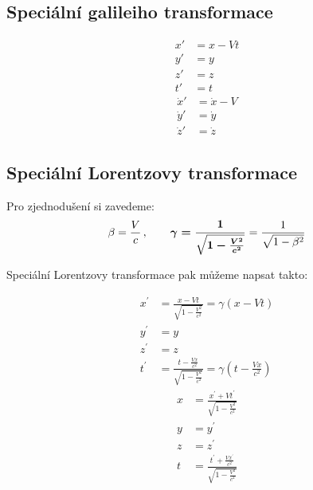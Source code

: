 \documentclass[a5paper,12pt]{article}
\begin{document}
\subsection{Speciální galileiho transformace}

\begin{multicols}{2}\noindent
\begin{align*}
	x' &= x - Vt\\
	y' &= y\\	
	z' &= z\\	
	t' &= t
\end{align*}
\columnbreak
\begin{align*}
	\dot{x}' &= \dot{x} - V\\
	\dot{y}' &= \dot{y}\\
	\dot{z}' &= \dot{z}
\end{align*}
\end{multicols}

\subsection{Speciální Lorentzovy transformace}

Pro zjednodušení si zavedeme:
\begin{equation*}
\beta = {V\over c}\,,		\qquad		\boldsymbol{\gamma = {1 \over \sqrt{1 - {V^2 \over c^2}}}} = {1 \over \sqrt{1-\beta^2}}
\end{equation*}

\noindent Speciální Lorentzovy transformace pak můžeme napsat takto:

\begin{multicols}{2}\noindent
\begin{align*}
x^\prime &= \frac{x - Vt}{\sqrt{1 - \frac{V^2}{c^2}}} = \gamma\left(x - Vt\right) \\
y^\prime &= y\\
z^\prime &= z\\
t^\prime &= \frac{t - \frac{Vx}{c^2}}{\sqrt{1 - \frac{V^2}{c^2}}} =  \gamma\left(t - \frac{Vx}{c^2}\right)
\end{align*}
\columnbreak
\begin{align*}
x &= \frac{x^\prime + Vt^\prime}{\sqrt{1 - \frac{V^2}{c^2}}}\\
y &= y^\prime\\
z &= z^\prime\\
t &= \frac{t^\prime + \frac{Vx^\prime}{c^2}}{\sqrt{1 - \frac{V^2}{c^2}}}
\end{align*}
\end{multicols}
\end{document}
